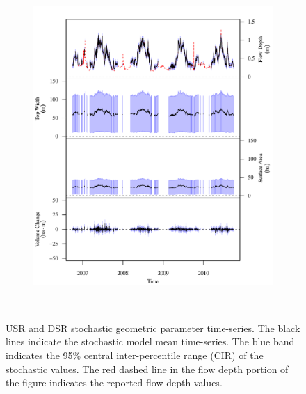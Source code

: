 \begin{linenumbers}
\begin{landscape}
\begin{figure}
\begin{subfigure}{0.7\textwidth}
			\includegraphics[width=\textwidth]{"Figures/Results_USR/Stochastic/G TS B"}
			\label{sub:GeoTS_B}
		\end{subfigure}\\
	\caption[USR and DSR stochastic geometric parameter time-series.]{USR and DSR stochastic geometric parameter time-series. The black lines indicate the stochastic model mean time-series.  The blue band indicates the 95\% central inter-percentile range (CIR) of the stochastic values.  The red dashed line in the flow depth portion of the figure indicates the reported flow depth values.}
	\label{fig:GeoTS_US}
	\end{figure}
\end{landscape}


\end{linenumbers}
